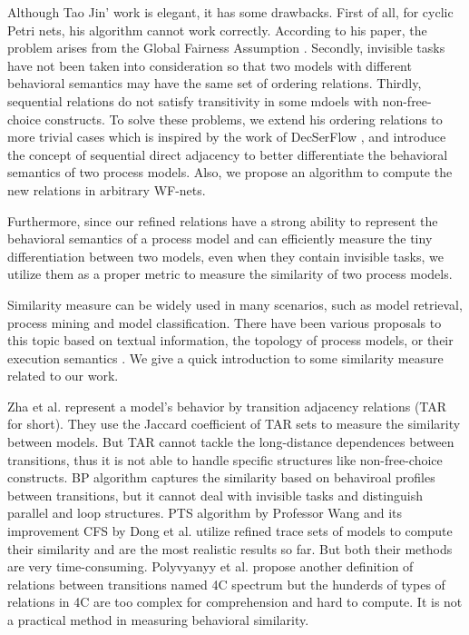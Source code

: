 \documentclass{llncs}
\begin{document}
Although Tao Jin' work is elegant, it has some drawbacks. First of all, for cyclic Petri nets, his algorithm cannot work correctly. According to his paper, the problem arises from the Global Fairness Assumption \cite{kindler1999liveness}. Secondly, invisible tasks have not been taken into consideration so that two models with different behavioral semantics may have the same set of ordering relations. Thirdly, sequential relations do not satisfy transitivity in some mdoels with non-free-choice constructs. To solve these problems, we extend his ordering relations to more trivial cases which is inspired by the work of DecSerFlow \cite{van2006decserflow}, and introduce the concept of sequential direct adjacency to better differentiate the behavioral semantics of two process models. Also, we propose an algorithm to compute the new relations in arbitrary WF-nets.

Furthermore, since our refined relations have a strong ability to represent the behavioral semantics of a process model and can efficiently measure the tiny differentiation between two models, even when they contain invisible tasks, we utilize them as a proper metric to measure the similarity of two process models.

Similarity measure can be widely used in many scenarios, such as model retrieval, process mining and model classification. There have been various proposals to this topic based on textual information, the topology of process models, or their execution semantics \cite{weidlich2011efficient}. We give a quick introduction to some similarity measure related to our work.

Zha et al. \cite{zha2010workflow} represent a model's behavior by transition adjacency relations (TAR for short). They use the Jaccard coefficient of TAR sets to measure the similarity between models. But TAR cannot tackle the long-distance dependences between transitions, thus it is not able to handle specific structures like non-free-choice constructs. BP algorithm \cite{weidlich2011efficient} captures the similarity based on behaviroal profiles between transitions, but it cannot deal with invisible tasks and distinguish parallel and loop structures. PTS algorithm by Professor Wang \cite{wang2010behavioral} and its improvement CFS by Dong et al. \cite{dong2014cfs} utilize refined trace sets of models to compute their similarity and are the most realistic results so far. But both their methods are very time-consuming. Polyvyanyy et al. \cite{polyvyanyy20144c} propose another definition of relations between transitions named 4C spectrum but the hunderds of types of relations in 4C are too complex for comprehension and hard to compute. It is not a practical method in measuring behavioral similarity.
\end{document}
